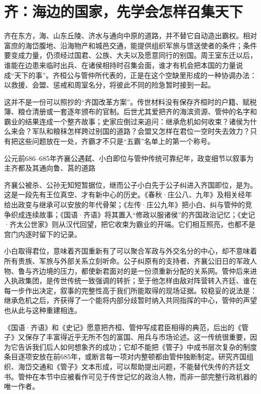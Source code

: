 \section{齐：海边的国家，先学会怎样召集天下}

齐在东方，海、山东丘陵、济水与通向中原的道路，并不替它自动造出霸权。相对富庶的海岱腹地、沿海物产和城邑交通，能提供组织军旅与馈送使者的条件；条件要变成力量，仍须经过国君、公族、大夫以及愿意同行的别国。周王室东迁以后，谁能在边患来临时出兵、在诸侯相持时召集会面，谁才有机会把本国的力量说成“天下的事”。齐桓公与管仲所代表的，正是在这个空缺里形成的一种协调办法：以救援、会盟、惩戒和周室名分，将彼此不同的险急暂时接到一起。

这并不是一份可以照抄的“齐国改革方案”。传世材料没有保存齐桓时的户籍、赋税簿、粮仓清册或一套逐年颁布的官制。后世尤其爱把齐的海滨资源、管仲的名字和霸业的结果连成一个整齐故事；史家应倒过来追问：继承危机如何收束？诸侯为什么来会？军队和粮秣怎样跨过别国的道路？会盟又怎样在君位一空时失去效力？只有把这些问题放在一处，齐霸才不只是“五霸”名单上的第一个称号。

\begin{event}{公元前686--685年}{齐襄公遇弑、小白即位与管仲传统}{可靠纪年，政变细节以叙事为主}{齐都及其通向鲁、莒的道路}

齐襄公被杀、公孙无知短暂据位，继而公子小白先于公子纠进入齐国即位，是为。这是一段先有王位真空、才有新中心的历史。《春秋·庄公八、九年》及相关经年给出政变与继承可以安放的年代骨架；《左传·庄公九年》把小白、纠与管仲的竞争织成连续故事；《国语·齐语》将其置入“修政以服诸侯”的齐国政治记忆；《史记·齐太公世家》则从汉代回望，把它收束为霸业的开端。它们相互照亮，也都不是宫门内逐时留下的记录。

小白取得君位，意味着齐国重新有了可以聚合军政与外交名分的中心，却不意味着所有贵族、军旅与外部关系立刻听命。公子纠原有的支持者、齐襄公旧日的军政人物、鲁与齐边境的压力，都使新君面对的是一份须重新分配的关系网。管仲后来进入执政集团，是传世传统一致强调的转折；至于他怎样由敌对阵营转入齐廷、谁在每一步作出决定，叙事的完整性高于我们所能取得的现场证据。较稳妥的说法是：继承危机之后，齐获得了一个能将内部分歧暂时纳入共同指挥的中心，管仲的声望也从此与这种重建相连。

《国语·齐语》和《史记》愿意把齐桓、管仲写成君臣相得的典范，后出的《管子》又保存了丰富得近乎无所不包的富国、用兵与市场论述。这一传统很重要，因为它告诉我们后人如何想象齐的成功；它却不能把《管子》中成书层次复杂的制度条目逐项安放在前685年，或断言每一项对内整顿都由管仲独断制定。研究齐国组织、海岱交通和《管子》文本形成，可以帮助提出问题，不能替代失传的齐廷文书。管仲在本节中应被看作可见于传世记忆的政治人物，而非一部完整行政机器的唯一作者。
\end{event}

